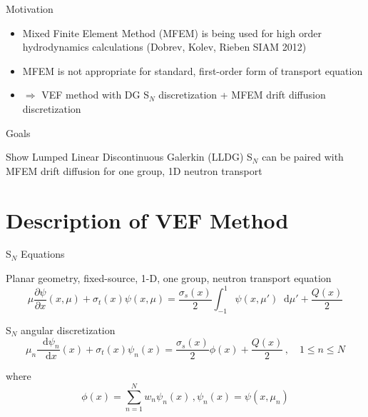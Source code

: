 \documentclass[10pt]{beamer}
\newcommand{\SN}{S$_N$\xspace}
\newcommand{\ud}{\mathop{}\!\mathrm{d}} %
\newcommand{\pderiv}[2]{\frac{\partial #1}{\partial #2}}
\newcommand{\dderiv}[2]{\frac{\ud #1}{\ud #2}}
\newcommand{\paren}[1]{\left(#1\right)}
\begin{document}
\begin{frame}{Motivation}

	\begin{itemize}

		\item Mixed Finite Element Method (MFEM) is being used for high order hydrodynamics calculations (Dobrev, Kolev, Rieben SIAM 2012)

		\item MFEM is not appropriate for standard, first-order form of transport equation 

		\item $\Rightarrow$ VEF method with DG \SN discretization + MFEM drift diffusion discretization 

	\end{itemize}

	\begin{alertblock}{Goals}
		
		Show Lumped Linear Discontinuous Galerkin (LLDG) \SN can be paired with MFEM drift diffusion for one group, 1D neutron transport 

	\end{alertblock}

\end{frame}

\section{Description of VEF Method}

\begin{frame}{\SN Equations}

	Planar geometry, fixed-source, 1-D, one group, neutron transport equation 
	\begin{equation*} 
		\mu \pderiv{\psi}{x} \paren{x, \mu} + \sigma_t(x) \psi(x,\mu) = 
			\frac{\sigma_s(x)}{2} \int_{-1}^1 \psi(x,\mu') \ud \mu' + \frac{Q(x)}{2}
	\end{equation*}

	\pause
	\SN angular discretization 
	\begin{equation*} \label{eq:sn}
		\mu_n \dderiv{\psi_n}{x}(x) + \sigma_t(x) \psi_n(x) = 
		\frac{\sigma_s(x)}{2} \phi(x) + \frac{Q(x)}{2} \,, \quad 1 \leq n \leq N
	\end{equation*}

	where 
	\begin{equation*}
		\phi(x) = \sum_{n=1}^N w_n \psi_n(x) \,, \psi_n(x) = \psi(x, \mu_n)
	\end{equation*}

\end{frame}
\end{document}

